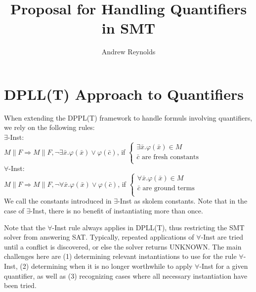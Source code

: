 \documentclass{llncs}
\begin{document}
\title{Proposal for Handling Quantifiers in SMT}

\author{Andrew Reynolds}

\date{}

\maketitle
\thispagestyle{empty}

\section{DPLL(T) Approach to Quantifiers}

When extending the DPPL(T) framework to handle formuls involving quantifiers, we rely on the following rules: \\

\noindent $\exists$-Inst: \\

$M \parallel F \Longrightarrow M \parallel F, \neg \exists \bar{x}. \varphi( \bar{ x } ) \vee \varphi( \bar{ c } )$, if   
$\begin{cases}
  \exists \bar{x}. \varphi( \bar{ x } ) \in M \\
  \bar{ c } \text{ are fresh constants} \\
\end{cases}$ \\

\noindent $\forall$-Inst: \\

$M \parallel F \Longrightarrow M \parallel F, \neg \forall \bar{x}. \varphi( \bar{ x } ) \vee \varphi( \bar{ c } )$, if   
$\begin{cases}
  \forall \bar{x}. \varphi( \bar{ x } ) \in M \\
  \bar{ c } \text{ are ground terms} \\
\end{cases}$ \\

We call the constants introduced in $\exists$-Inst as skolem constants.
Note that in the case of $\exists$-Inst, there is no benefit of instantiating more than once.

Note that the $\forall$-Inst rule always applies in DPLL(T), thus restricting the SMT solver from answering SAT.
Typically, repeated applications of $\forall$-Inst are tried until a conflict is discovered, or else the solver returns UNKNOWN.
The main challenges here are (1) determining relevant instantiations to use for the rule $\forall$-Inst, (2) determining when it is no longer worthwhile to apply $\forall$-Inst for a given quantifier, as well as (3) recognizing cases where all necessary instantiation have been tried.
\end{document}
